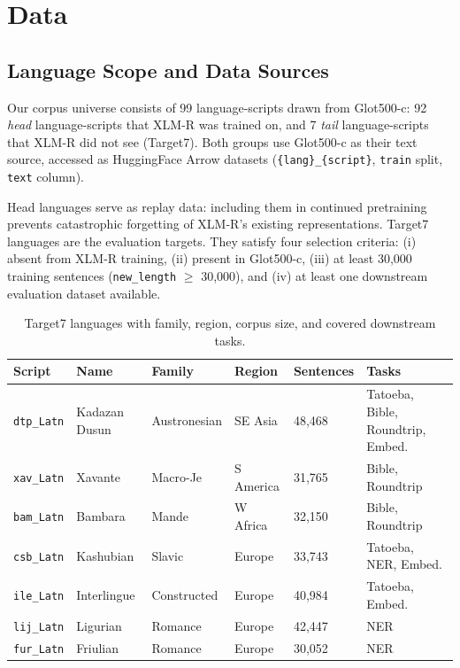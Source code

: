 \section{Data}

\subsection{Language Scope and Data Sources}

Our corpus universe consists of 99 language-scripts drawn from Glot500-c:
92 \emph{head} language-scripts that XLM-R was trained on, and 7 \emph{tail}
language-scripts that XLM-R did not see (Target7).
Both groups use Glot500-c as their text source, accessed as HuggingFace Arrow datasets
(\texttt{\{lang\}\_\{script\}}, \texttt{train} split, \texttt{text} column).

Head languages serve as replay data: including them in continued pretraining prevents
catastrophic forgetting of XLM-R's existing representations.
Target7 languages are the evaluation targets.
They satisfy four selection criteria:
(i) absent from XLM-R training,
(ii) present in Glot500-c,
(iii) at least 30,000 training sentences (\texttt{new\_length} $\geq$ 30,000),
and (iv) at least one downstream evaluation dataset available.

\begin{table}[h]\centering\small
\caption{Target7 languages with family, region, corpus size, and covered downstream tasks.}
\label{tab:target7}
\begin{tabular}{@{}lllllp{3.5cm}@{}}
\toprule
Script & Name & Family & Region & Sentences & Tasks \\
\midrule
\texttt{dtp\_Latn} & Kadazan Dusun & Austronesian & SE Asia & 48,468 & Tatoeba, Bible, Roundtrip, Embed. \\
\texttt{xav\_Latn} & Xavante & Macro-Je & S America & 31,765 & Bible, Roundtrip \\
\texttt{bam\_Latn} & Bambara & Mande & W Africa & 32,150 & Bible, Roundtrip \\
\texttt{csb\_Latn} & Kashubian & Slavic & Europe & 33,743 & Tatoeba, NER, Embed. \\
\texttt{ile\_Latn} & Interlingue & Constructed & Europe & 40,984 & Tatoeba, Embed. \\
\texttt{lij\_Latn} & Ligurian & Romance & Europe & 42,447 & NER \\
\texttt{fur\_Latn} & Friulian & Romance & Europe & 30,052 & NER \\
\bottomrule
\end{tabular}
\end{table}

